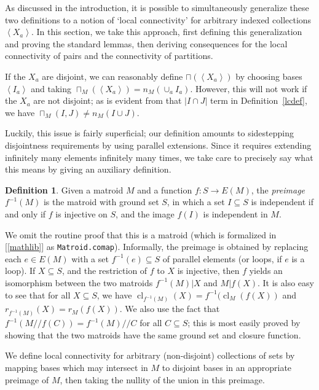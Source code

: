 \documentclass{amsart}
\theoremstyle{plain}
\newcounter{defn}
\theoremstyle{definition}
\newtheorem{definition}[defn]{Definition}
\newcommand{\dcon}{/ \!\! /}
\DeclareMathOperator{\cl}{cl}
\newcommand{\ab}[1]{\left\langle#1\right\rangle}
\renewcommand{\ss}{\subseteq}
\newcommand{\smalltt}[1]{{\small\texttt{#1}}}
\begin{document}
As discussed in the introduction, it is possible to simultaneously generalize these two definitions
to a notion of `local connectivity' for arbitrary indexed collections $\ab{X_a}$. 
In this section, we take this approach, first defining this generalization 
and proving the standard lemmas, 
then deriving consequences for the local connectivity of pairs 
and the connectivity of partitions. 

If the $X_a$ are disjoint, we can reasonably define $\sqcap(\ab{X_a})$
by choosing bases $\ab{I_a}$ and taking $\sqcap_M(\ab{X_a}) = n_M(\cup_a I_a)$. 
However, this will not work if the $X_a$ are not disjoint; 
as is evident from that $|I \cap J|$ term in Definition~\ref{lcdef}, 
we have $\sqcap_M(I,J) \ne n_M(I \cup J)$. 

Luckily, this issue is fairly superficial; 
our definition amounts to sidestepping disjointness requirements by using parallel extensions.
Since it requires extending infinitely many elements infinitely many times, 
we take care to precisely say what this means by giving an auxiliary definition. 

\begin{definition}
Given a matroid $M$ and a function $f : S \to E(M)$, 
the \emph{preimage} $f^{-1}(M)$ is the matroid with ground set $S$, 
in which a set $I \ss S$ is independent if and only if $f$ is injective on $S$, and the image $f(I)$ 
is independent in $M$. 
\end{definition}

We omit the routine proof that this is a matroid
(which is formalized in [\ref{mathlib}] as \smalltt{Matroid.comap}). 
Informally, the preimage
is obtained by replacing each $e \in E(M)$ with a set $f^{-1}(e) \ss S$ of parallel elements (or loops, if $e$ is a loop). 
If $X \ss S$, and the restriction of $f$ to $X$ is injective,
then $f$ yields an isomorphism between the two matroids $f^{-1}(M) | X$ and $M | f(X)$. 
It is also easy to see that for all $X \ss S$, 
we have $\cl_{f^{-1}(M)}(X) = f^{-1}(\cl_M(f(X))$ 
and $r_{f^{-1}(M)}(X) = r_M(f(X))$. 
We also use the fact that $f^{-1}(M \dcon f(C)) = f^{-1}(M) \dcon C$ 
for all $C \ss S$; this is most easily proved by showing that the two matroids
have the same ground set and closure function. 

We define local connectivity for arbitrary (non-disjoint) collections of sets 
by mapping bases which may intersect in $M$ to disjoint bases in an appropriate preimage of $M$, 
then taking the nullity of the union in this preimage. 
\end{document}
